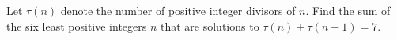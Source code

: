 Let $\tau\left(n\right)$ denote the number of positive integer divisors of $n$. Find the sum of the six least positive integers $n$ that are solutions to $\tau\left(n\right)+\tau\left(n+1\right)=7$.